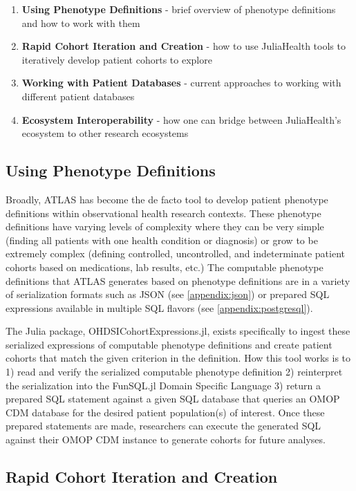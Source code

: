 \documentclass{juliacon}
\begin{document}
\begin{enumerate}
  \item \textbf{Using Phenotype Definitions} - brief overview of phenotype definitions and how to work with them
  \item \textbf{Rapid Cohort Iteration and Creation} - how to use JuliaHealth tools to iteratively develop patient cohorts to explore
  \item \textbf{Working with Patient Databases} - current approaches to working with different patient databases
  \item \textbf{Ecosystem Interoperability} - how one can bridge between JuliaHealth's ecosystem to other research ecosystems
\end{enumerate}

\subsection{Using Phenotype Definitions}

Broadly, ATLAS has become the de facto tool to develop patient phenotype definitions within observational health research contexts.
These phenotype definitions have varying levels of complexity where they can be very simple (finding all patients with one health condition or diagnosis) or grow to be extremely complex (defining controlled, uncontrolled, and indeterminate patient cohorts based on medications, lab results, etc.)
The computable phenotype definitions that ATLAS generates based on phenotype definitions are in a variety of serialization formats such as JSON (see \ref{appendix:json}) or prepared SQL expressions available in multiple SQL flavors (see \ref{appendix:postgresql}).

The Julia package, OHDSICohortExpressions.jl, exists specifically to ingest these serialized expressions of computable phenotype definitions and create patient cohorts that match the given criterion in the definition.
How this tool works is to 1) read and verify the serialized computable phenotype definition 2) reinterpret the serialization into the FunSQL.jl Domain Specific Language 3) return a prepared SQL statement against a given SQL database that queries an OMOP CDM database for the desired patient population(s) of interest.
Once these prepared statements are made, researchers can execute the generated SQL against their OMOP CDM instance to generate cohorts for future analyses.

\subsection{Rapid Cohort Iteration and Creation}
\end{document}

